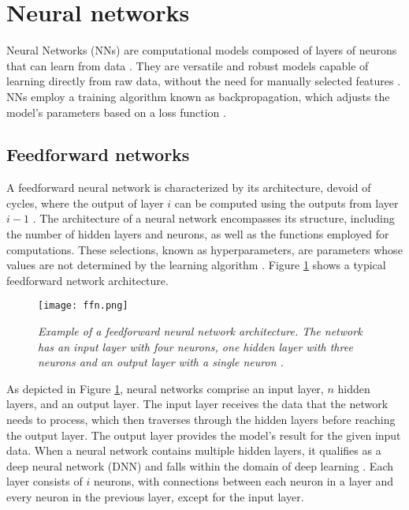 \section{Neural networks}

Neural Networks (NNs) are computational models composed of layers of neurons that can learn from data \cite{oshea2015introduction}. They are versatile and robust models capable of learning directly from raw data, without the need for manually selected features \cite{lipton2015critical}. NNs employ a training algorithm known as backpropagation, which adjusts the model's parameters based on a loss function \cite{lipton2015critical}.

\subsection{Feedforward networks}

A feedforward neural network is characterized by its architecture, devoid of cycles, where the output of layer \(i\) can be computed using the outputs from layer \(i - 1\) \cite{lipton2015critical}. The architecture of a neural network encompasses its structure, including the number of hidden layers and neurons, as well as the functions employed for computations. These selections, known as hyperparameters, are parameters whose values are not determined by the learning algorithm \cite{nnanddl}. Figure \ref{fig:ffn} shows a typical feedforward network architecture.


\begin{figure}[H]
    \centering
    \texttt{[image: ffn.png]}
    \caption[Example of a feedforward neural network architecture \cite{lipton2015critical}.]{
        \it{Example of a feedforward neural network architecture. The network has an
            input layer with four neurons, one hidden layer with three neurons and an output layer with a single neuron \cite{lipton2015critical}.}
    }
    \label{fig:ffn}
\end{figure}

As depicted in Figure \ref{fig:ffn}, neural networks comprise an input layer, \(n\) hidden layers, and an output layer. The input layer receives the data that the network needs to process, which then traverses through the hidden layers before reaching the output layer. The output layer provides the model's result for the given input data. When a neural network contains multiple hidden layers, it qualifies as a deep neural network (DNN) and falls within the domain of deep learning \cite{oshea2015introduction}. Each layer consists of \(i\) neurons, with connections between each neuron in a layer and every neuron in the previous layer, except for the input layer.

